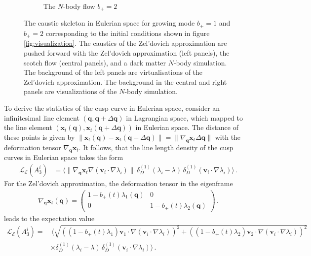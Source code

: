 \documentclass[a4paper, 11pt]{article}
\begin{document}
\begin{figure}
\begin{subfigure}[b]{0.32\textwidth}
\caption{The $N$-body flow $b_+=2$}
\end{subfigure}
\caption{The caustic skeleton in Eulerian space for growing mode $b_+=1$ and $b_+=2$ corresponding to the initial conditions shown in figure \ref{fig:visualization}. The caustics of the Zel'dovich approximation are pushed forward with the Zel'dovich approximation (left panels), the scotch flow (central panels), and a dark matter $N$-body simulation. The background of the left panels are virtualisations of the Zel'dovich approximation. The background in the central and right panels are visualizations of the $N$-body simulation.}
\label{fig:EulerianSkeletonSimulation}
\end{figure}

To derive the statistics of the cusp curve in Eulerian space, consider an infinitesimal line element $(\bm{q}, \bm{q}+\Delta\bm{q})$ in Lagrangian space, which mapped to the line element $(\bm{x}_t(\bm{q}), \bm{x}_t(\bm{q} + \Delta \bm{q}))$ in Eulerian space. The distance of these points is given by $\|\bm{x}_t(\bm{q}) - \bm{x}_t(\bm{q} + \Delta \bm{q})\| = \| \nabla_{\bm{q}}\bm{x}_t \Delta \bm{q}\|$ with the deformation tensor $\nabla_{\bm{q}}\bm{x}_t $. It follows, that the line length density of the cusp curves in Eulerian space takes the form
\begin{align}
\mathcal{L}_{\mathcal{E}}(A_3^i)&=
\langle \| \nabla_{\bm{q}}\bm{x}_t \nabla (\bm{v}_i \cdot \nabla \lambda_i)\|\, \delta_D^{(1)}(\lambda_i - \lambda)\,
\delta_D^{(1)}(\bm{v}_i\cdot \nabla \lambda_i)\rangle\,.
\end{align}
For the Zel'dovich approximation, the deformation tensor in the eigenframe
\begin{align}
\nabla_{\bm{q}}\bm{x}_t(\bm{q})=  \begin{pmatrix}1-b_+(t)\lambda_1(\bm{q}) & 0 \\ 0 &1-b_+(t) \lambda_2(\bm{q})\end{pmatrix}\,.
\end{align}
leads to the expectation value
\begin{align}
\mathcal{L}_{\mathcal{E}}(A_3^i)=&\,
\big \langle \sqrt{
((1-b_+(t)\lambda_1) \bm{v}_1 \cdot \nabla (\bm{v}_i \cdot \nabla \lambda_i))^2+
((1-b_+(t)\lambda_2) \bm{v}_2 \cdot \nabla (\bm{v}_i \cdot \nabla \lambda_i))^2
}\nonumber\\
&\times \delta_D^{(1)}(\lambda_i - \lambda)\,
\delta_D^{(1)}(\bm{v}_i\cdot \nabla \lambda_i)\big\rangle\,.
\end{align}
\end{document}
